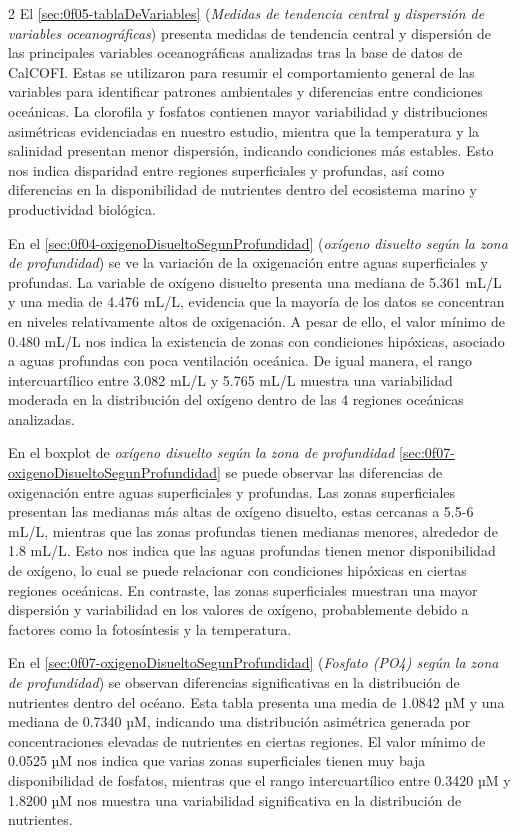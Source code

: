 \begin{multicols}{2}
\tab El \ref{sec:0f05-tablaDeVariables} (\textit{Medidas de tendencia central y dispersión de variables oceanográficas}) presenta medidas de tendencia central y dispersión de las principales variables oceanográficas analizadas tras la base de datos de CalCOFI. Estas se utilizaron para resumir el comportamiento general de las variables para identificar patrones ambientales y diferencias entre condiciones oceánicas. La clorofila y fosfatos contienen mayor variabilidad y distribuciones asimétricas evidenciadas en nuestro estudio, mientra que la temperatura y la salinidad presentan menor dispersión, indicando condiciones más estables. Esto nos indica disparidad entre regiones superficiales y profundas, así como diferencias en la disponibilidad de nutrientes dentro del ecosistema marino y productividad biológica. 

\tab En el \ref{sec:0f04-oxigenoDisueltoSegunProfundidad} (\textit{oxígeno disuelto según la zona de profundidad}) se ve la variación de la oxigenación entre aguas superficiales y profundas. La variable de oxígeno disuelto presenta una mediana de 5.361 mL/L y una media de 4.476 mL/L, evidencia que la mayoría de los datos se concentran en niveles relativamente altos de oxigenación. A pesar de ello, el valor mínimo de 0.480 mL/L nos indica la existencia de zonas con condiciones hipóxicas, asociado a aguas profundas con poca ventilación oceánica. De igual manera, el rango intercuartílico entre 3.082 mL/L y 5.765 mL/L muestra una variabilidad moderada en la distribución del oxígeno dentro de las 4 regiones oceánicas analizadas.

\tab En el boxplot de \textit{oxígeno disuelto según la zona de profundidad} \ref{sec:0f07-oxigenoDisueltoSegunProfundidad} se puede observar las diferencias de oxigenación entre aguas superficiales y profundas. Las zonas superficiales presentan las medianas más altas de oxígeno disuelto,  estas cercanas a 5.5-6 mL/L,  mientras que las zonas profundas tienen medianas menores, alrededor de 1.8 mL/L. Esto nos indica que las aguas profundas tienen menor disponibilidad de oxígeno, lo cual se puede relacionar con condiciones hipóxicas en ciertas regiones oceánicas. En contraste, las zonas superficiales muestran una mayor dispersión y variabilidad en los valores de oxígeno, probablemente debido a factores como la fotosíntesis y la temperatura.

\tab En el \ref{sec:0f07-oxigenoDisueltoSegunProfundidad} (\textit{Fosfato (PO4) según la zona de profundidad}) se observan diferencias significativas en la distribución de nutrientes dentro del océano. Esta tabla presenta una media de 1.0842 µM y una mediana de 0.7340 µM, indicando una distribución asimétrica generada por concentraciones elevadas de nutrientes en ciertas regiones. El valor mínimo de 0.0525 µM nos indica que varias zonas superficiales tienen muy baja disponibilidad de fosfatos, mientras que el rango intercuartílico entre 0.3420 µM y 1.8200 µM nos muestra una variabilidad significativa en la distribución de nutrientes. 


\end{multicols}
